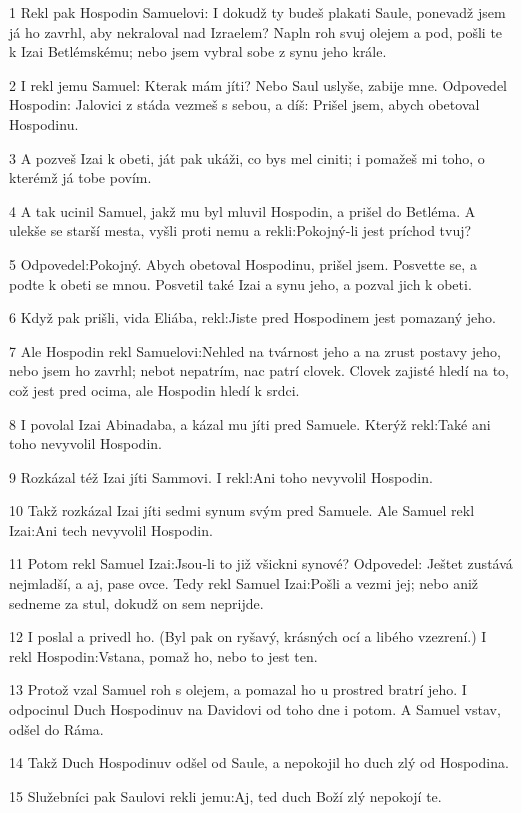 \par 1 Rekl pak Hospodin Samuelovi: I dokudž ty budeš plakati Saule, ponevadž jsem já ho zavrhl, aby nekraloval nad Izraelem? Napln roh svuj olejem a pod, pošli te k Izai Betlémskému; nebo jsem vybral sobe z synu jeho krále.
\par 2 I rekl jemu Samuel: Kterak mám jíti? Nebo Saul uslyše, zabije mne. Odpovedel Hospodin: Jalovici z stáda vezmeš s sebou, a díš: Prišel jsem, abych obetoval Hospodinu.
\par 3 A pozveš Izai k obeti, ját pak ukáži, co bys mel ciniti; i pomažeš mi toho, o kterémž já tobe povím.
\par 4 A tak ucinil Samuel, jakž mu byl mluvil Hospodin, a prišel do Betléma. A ulekše se starší mesta, vyšli proti nemu a rekli:Pokojný-li jest príchod tvuj?
\par 5 Odpovedel:Pokojný. Abych obetoval Hospodinu, prišel jsem. Posvette se, a podte k obeti se mnou. Posvetil také Izai a synu jeho, a pozval jich k obeti.
\par 6 Když pak prišli, vida Eliába, rekl:Jiste pred Hospodinem jest pomazaný jeho.
\par 7 Ale Hospodin rekl Samuelovi:Nehled na tvárnost jeho a na zrust postavy jeho, nebo jsem ho zavrhl; nebot nepatrím, nac patrí clovek. Clovek zajisté hledí na to, což jest pred ocima, ale Hospodin hledí k srdci.
\par 8 I povolal Izai Abinadaba, a kázal mu jíti pred Samuele. Kterýž rekl:Také ani toho nevyvolil Hospodin.
\par 9 Rozkázal též Izai jíti Sammovi. I rekl:Ani toho nevyvolil Hospodin.
\par 10 Takž rozkázal Izai jíti sedmi synum svým pred Samuele. Ale Samuel rekl Izai:Ani tech nevyvolil Hospodin.
\par 11 Potom rekl Samuel Izai:Jsou-li to již všickni synové? Odpovedel: Ještet zustává nejmladší, a aj, pase ovce. Tedy rekl Samuel Izai:Pošli a vezmi jej; nebo aniž sedneme za stul, dokudž on sem neprijde.
\par 12 I poslal a privedl ho. (Byl pak on ryšavý, krásných ocí a libého vzezrení.) I rekl Hospodin:Vstana, pomaž ho, nebo to jest ten.
\par 13 Protož vzal Samuel roh s olejem, a pomazal ho u prostred bratrí jeho. I odpocinul Duch Hospodinuv na Davidovi od toho dne i potom. A Samuel vstav, odšel do Ráma.
\par 14 Takž Duch Hospodinuv odšel od Saule, a nepokojil ho duch zlý od Hospodina.
\par 15 Služebníci pak Saulovi rekli jemu:Aj, ted duch Boží zlý nepokojí te.
